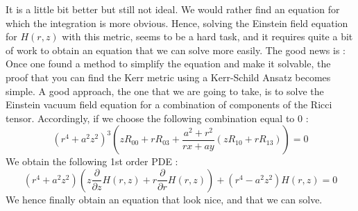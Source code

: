 \documentclass[a4paper,12pt]{article}
\theoremstyle{definition}
\begin{document}
It is a little bit better but still not ideal.
We would rather find an equation for which the integration is more obvious.
Hence, solving the Einstein field equation for $H(r,z)$ with this metric, seems to be a hard task,
and it requires quite a bit of work to obtain an equation that we can solve more easily.
The good news is : Once one found a method to simplify the equation and make it solvable, the proof that you can find the Kerr metric using a Kerr-Schild Ansatz becomes simple.
A good approach, the one that we are going to take, is to solve the Einstein vacuum field equation for a combination of components of the Ricci tensor.
Accordingly, if we choose the following combination equal to $0$ :
\begin{equation}
	(r^4+a^2z^2)^3(zR_{00}+rR_{03}+\frac{a^2+r^2}{rx+ay}(zR_{10}+rR_{13}))=0
\end{equation}
We obtain the following 1st order PDE :
\begin{equation}\label{Kerr:equation}
	(r^4+a^2z^2)(z \frac{\partial}{\partial z}H(r,z)+r\frac{\partial}{\partial r}H(r,z))+(r^4-a^2 z^2) H(r,z)=0
\end{equation}
We hence finally obtain an equation that look nice, and that we can solve.
\end{document}
